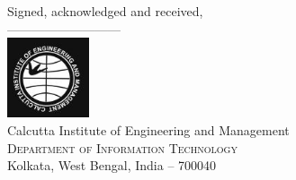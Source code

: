 \documentclass[11pt, a4paper]{thesis}
\begin{document}
\begin{titlepage}
\begin{center}
\vfill

Signed, acknowledged and received,\\
\vspace{0.5in}
---------------------------\\
\vfill
\includegraphics[width=0.18\textwidth]{ciem-logo.jpg}\\[0.1in]
\Large{Calcutta Institute of Engineering and Management}\\
\normalsize
\textsc{Department of Information Technology}\\
Kolkata, West Bengal, India -- 700040 \\
\vspace{0.2cm}

\end{center}

\end{titlepage}
\end{document}
